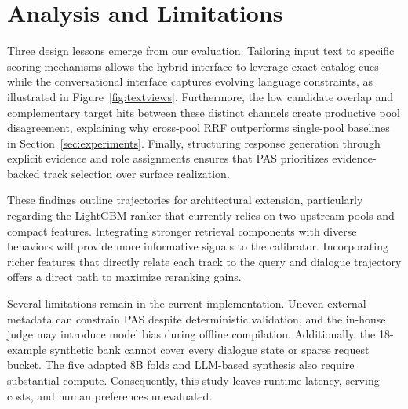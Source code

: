 \section{Analysis and Limitations}

Three design lessons emerge from our evaluation. Tailoring input text to specific scoring mechanisms allows the hybrid interface to leverage exact catalog cues while the conversational interface captures evolving language constraints, as illustrated in Figure~\ref{fig:textviews}. Furthermore, the low candidate overlap and complementary target hits between these distinct channels create productive pool disagreement, explaining why cross-pool RRF outperforms single-pool baselines in Section~\ref{sec:experiments}. Finally, structuring response generation through explicit evidence and role assignments ensures that PAS prioritizes evidence-backed track selection over surface realization.

These findings outline trajectories for architectural extension, particularly regarding the LightGBM ranker that currently relies on two upstream pools and compact features. Integrating stronger retrieval components with diverse behaviors will provide more informative signals to the calibrator. Incorporating richer features that directly relate each track to the query and dialogue trajectory offers a direct path to maximize reranking gains.

Several limitations remain in the current implementation. Uneven external metadata can constrain PAS despite deterministic validation, and the in-house judge may introduce model bias during offline compilation. Additionally, the 18-example synthetic bank cannot cover every dialogue state or sparse request bucket. The five adapted 8B folds and LLM-based synthesis also require substantial compute. Consequently, this study leaves runtime latency, serving costs, and human preferences unevaluated.